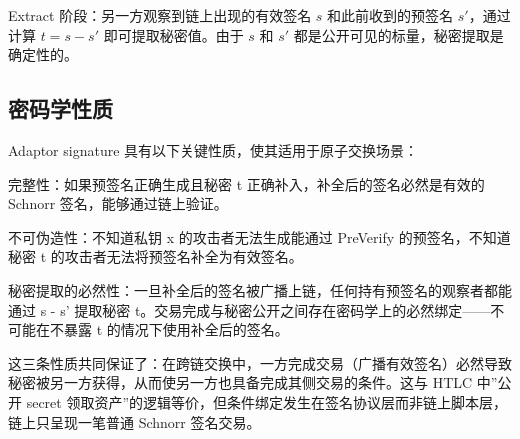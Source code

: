 Extract 阶段：另一方观察到链上出现的有效签名 \(s\) 和此前收到的预签名 \(s'\)，通过计算 \(t = s - s'\) 即可提取秘密值。由于 \(s\) 和 \(s'\) 都是公开可见的标量，秘密提取是确定性的。


\subsection{密码学性质}


Adaptor signature 具有以下关键性质，使其适用于原子交换场景：


完整性：如果预签名正确生成且秘密 t 正确补入，补全后的签名必然是有效的 Schnorr 签名，能够通过链上验证。


不可伪造性：不知道私钥 x 的攻击者无法生成能通过 PreVerify 的预签名，不知道秘密 t 的攻击者无法将预签名补全为有效签名。


秘密提取的必然性：一旦补全后的签名被广播上链，任何持有预签名的观察者都能通过 s - s' 提取秘密 t。交易完成与秘密公开之间存在密码学上的必然绑定——不可能在不暴露 t 的情况下使用补全后的签名。


这三条性质共同保证了：在跨链交换中，一方完成交易（广播有效签名）必然导致秘密被另一方获得，从而使另一方也具备完成其侧交易的条件。这与 HTLC 中”公开 secret 领取资产”的逻辑等价，但条件绑定发生在签名协议层而非链上脚本层，链上只呈现一笔普通 Schnorr 签名交易。
